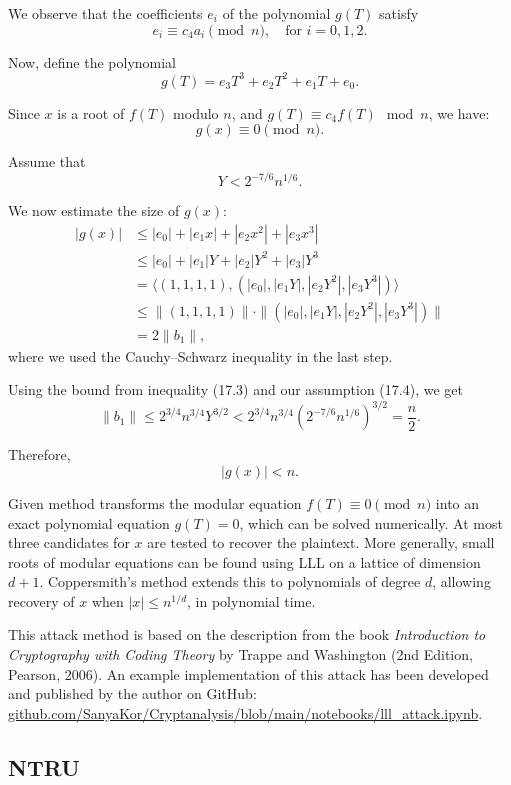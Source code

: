 \documentclass[a4paper,12pt]{article}
\begin{document}
We observe that the coefficients \( e_i \) of the polynomial \( g(T) \) satisfy
\[
e_i \equiv c_4 a_i \pmod{n}, \quad \text{for } i = 0, 1, 2.
\]

Now, define the polynomial
\[
g(T) = e_3 T^3 + e_2 T^2 + e_1 T + e_0.
\]

Since \( x \) is a root of \( f(T) \) modulo \( n \), and \( g(T) \equiv c_4 f(T) \mod n \), we have:
\[
g(x) \equiv 0 \pmod{n}.
\]

Assume that
\[
Y < 2^{-7/6} n^{1/6}. \tag{17.4}
\]

We now estimate the size of \( g(x) \):
\[
\begin{aligned}
|g(x)| &\leq |e_0| + |e_1 x| + |e_2 x^2| + |e_3 x^3| \\
       &\leq |e_0| + |e_1|Y + |e_2|Y^2 + |e_3|Y^3 \\
       &= \langle (1, 1, 1, 1), (|e_0|, |e_1 Y|, |e_2 Y^2|, |e_3 Y^3|) \rangle \\
       &\leq \|(1,1,1,1)\| \cdot \|(|e_0|, |e_1 Y|, |e_2 Y^2|, |e_3 Y^3|)\| \\
       &= 2 \|b_1\|,
\end{aligned}
\]
where we used the Cauchy–Schwarz inequality in the last step.

Using the bound from inequality (17.3) and our assumption (17.4), we get
\[
\|b_1\| \leq 2^{3/4} n^{3/4} Y^{3/2} < 2^{3/4} n^{3/4} \left(2^{-7/6} n^{1/6}\right)^{3/2} = \frac{n}{2}.
\]

Therefore,
\[
|g(x)| < n.
\]

Given method transforms the modular equation \( f(T) \equiv 0 \pmod{n} \) into an exact polynomial equation \( g(T) = 0 \), which can be solved numerically. At most three candidates for \( x \) are tested to recover the plaintext. More generally, small roots of modular equations can be found using LLL on a lattice of dimension \( d+1 \). Coppersmith's method extends this to polynomials of degree \( d \), allowing recovery of \( x \) when \( |x| \leq n^{1/d} \), in polynomial time.


 This attack method is based on the description from the book \textit{Introduction to Cryptography with Coding Theory} by Trappe and Washington (2nd Edition, Pearson, 2006). An example implementation of this attack has been developed and published by the author on GitHub: \href{https://github.com/SanyaKor/Cryptanalysis/blob/main/notebooks/lll\_attack.ipynb}{github.com/SanyaKor/Cryptanalysis/blob/main/notebooks/lll\_attack.ipynb}.


\subsection{NTRU}
\end{document}
